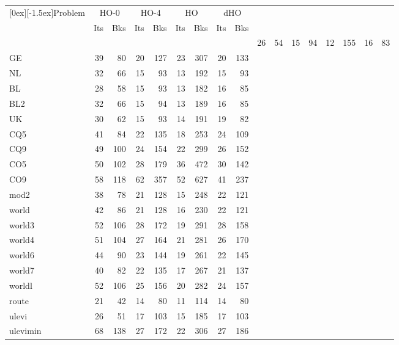 %
%

\begin{small}
\begin{longtable}{|l|rr|rr|rr|rr|} \hline 
\raisebox{-1.5ex}[0ex][-1.5ex]{Problem}
& \multicolumn{2}{c|}{HO-0}
& \multicolumn{2}{c|}{HO-4} 
& \multicolumn{2}{c|}{HO\raisebox{1pt}{-$\infty$}} 
& \multicolumn{2}{c|}{dHO} \\ \cline{2-9}
& Its & Bks
& Its & Bks
& Its & Bks
& Its & Bks \\ \hline
\endhead
\hline
\multicolumn{9}{c}{\raisebox{-1ex}{Table~\ref{BNresults}: Comparison on 
    large problems.}}
\endfoot
\label{BNresults}
CH & 26 & 54 & 15 & 94 & 12 & 155 & 16 & 83 \\
GE & 39 & 80 & 20 & 127 & 23 & 307 & 20 & 133 \\
NL & 32 & 66 & 15 & 93 & 13 & 192 & 15 & 93 \\
BL & 28 & 58 & 15 & 93 & 13 & 182 & 16 & 85 \\
BL2 & 32 & 66 & 15 & 94 & 13 & 189 & 16 & 85 \\
UK & 30 & 62 & 15 & 93 & 14 & 191 & 19 & 82 \\
CQ5 & 41 & 84 & 22 & 135 & 18 & 253 & 24 & 109 \\
CQ9 & 49 & 100 & 24 & 154 & 22 & 299 & 26 & 152 \\
CO5 & 50 & 102 & 28 & 179 & 36 & 472 & 30 & 142 \\
CO9 & 58 & 118 & 62 & 357 & 52 & 627 & 41 & 237 \\
mod2 & 38 & 78 & 21 & 128 & 15 & 248 & 22 & 121 \\
world & 42 & 86 & 21 & 128 & 16 & 230 & 22 & 121 \\
world3 & 52 & 106 & 28 & 172 & 19 & 291 & 28 & 158 \\
world4 & 51 & 104 & 27 & 164 & 21 & 281 & 26 & 170 \\
world6 & 44 & 90 & 23 & 144 & 19 & 261 & 22 & 145 \\
world7 & 40 & 82 & 22 & 135 & 17 & 267 & 21 & 137 \\
worldl & 52 & 106 & 25 & 156 & 20 & 282 & 24 & 157 \\
route & 21 & 42 & 14 & 80 & 11 & 114 & 14 & 80 \\
ulevi & 26 & 51 & 17 & 103 & 15 & 185 & 17 & 103 \\
ulevimin & 68 & 138 & 27 & 172 & 22 & 306 & 27 & 186 \\

\end{longtable}
\end{small}
